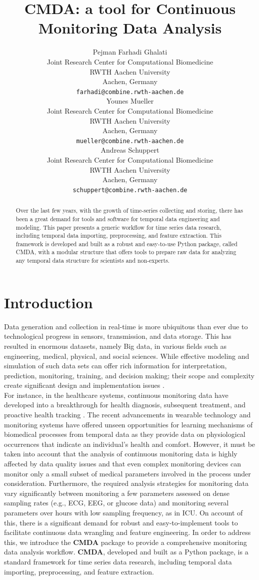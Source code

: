\documentclass{article}
\title{\textbf{CMDA}: a tool for Continuous Monitoring Data Analysis}
\author{ Pejman Farhadi Ghalati
 	\\
	Joint Research Center for Computational Biomedicine\\
	RWTH Aachen University\\
	Aachen, Germany \\
	\texttt{farhadi@combine.rwth-aachen.de} \\
	\And
	Younes Mueller \\
    Joint Research Center for Computational Biomedicine\\
	RWTH Aachen University\\
	Aachen, Germany \\
	\texttt{mueller@combine.rwth-aachen.de} \\
	\And
	Andreas Schuppert\\
    Joint Research Center for Computational Biomedicine\\
	RWTH Aachen University\\
	Aachen, Germany \\
	\texttt{schuppert@combine.rwth-aachen.de} \\
}
\begin{document}
\maketitle

\begin{abstract}
Over the last few years, with the growth of time-series collecting and storing, there has been a great demand for tools and software for temporal data engineering and modeling. This paper presents a generic workflow for time series data research, including temporal data importing, preprocessing, and feature extraction. This framework is developed and built as a robust and easy-to-use Python package, called CMDA, with a modular structure that offers tools to prepare raw data for analyzing any temporal data structure for scientists and non-experts.
\end{abstract}





\section{Introduction}
Data generation and collection in real-time is more ubiquitous than ever due to technological progress in sensors, transmission, and data storage. This has resulted in enormous datasets, namely Big data, in various fields such as engineering, medical, physical, and social sciences. While effective modeling and simulation of such data sets can offer rich information for interpretation, prediction, monitoring, training, and decision making; their scope and complexity create significant design and implementation issues \cite{frohlich_hype_2018}.\\
For instance, in the healthcare systems, continuous monitoring data have developed into a breakthrough for health diagnosis, subsequent treatment, and proactive health tracking \cite{athavale_biosignal_2017}. The recent advancements in wearable technology and monitoring systems have offered unseen opportunities for learning mechanisms of biomedical processes from temporal data as they provide data on physiological occurrences that indicate an individual’s health and comfort. 
However, it must be taken into account that the analysis of continuous monitoring data is highly affected by data quality issues and that even complex monitoring devices can monitor only a small subset of medical parameters involved in the process under consideration. Furthermore, the required analysis strategies for monitoring data vary significantly between monitoring a few parameters assessed on dense sampling rates (e.g., ECG, EEG, or glucose data) and monitoring several parameters over hours with low sampling frequency, as in ICU. 
On account of this, there is a significant demand for robust and easy-to-implement tools to facilitate continuous data wrangling and feature engineering.
In order to address this, we introduce the \textbf{CMDA} package to provide a comprehensive monitoring data analysis workflow.
\textbf{CMDA}, developed and built as a Python package, is a standard framework for time series data research, including temporal data importing, preprocessing, and feature extraction.
\end{document}
